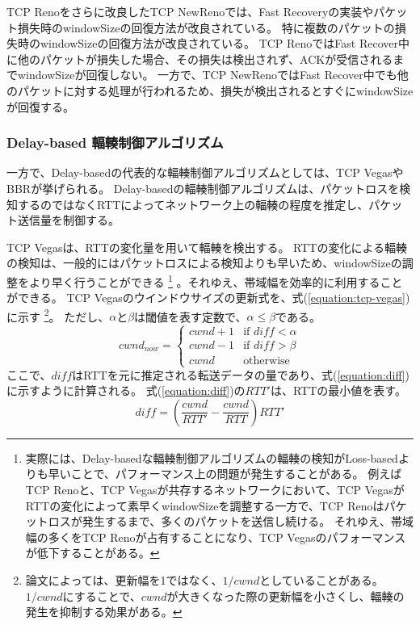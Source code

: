 \documentclass[a4paper,11pt]{jreport}
\newcommand{\equationref}[1]{式(\ref{#1})}
\begin{document}
TCP Renoをさらに改良したTCP NewReno\cite{floyd2004newreno,henderson2012newreno}では、Fast Recoveryの実装やパケット損失時のwindowSizeの回復方法が改良されている。
特に複数のパケットの損失時のwindowSizeの回復方法が改良されている。
TCP RenoではFast Recover中に他のパケットが損失した場合、その損失は検出されず、ACKが受信されるまでwindowSizeが回復しない。
一方で、TCP NewRenoではFast Recover中でも他のパケットに対する処理が行われるため、損失が検出されるとすぐにwindowSizeが回復する。

\cite{cubic}

\subsubsection*{Delay-based 輻輳制御アルゴリズム}

一方で、Delay-basedの代表的な輻輳制御アルゴリズムとしては、TCP Vegas\cite{tcp-vegas}やBBR\cite{bbr}が挙げられる。
Delay-basedの輻輳制御アルゴリズムは、パケットロスを検知するのではなくRTTによってネットワーク上の輻輳の程度を推定し、パケット送信量を制御する。

TCP Vegasは、RTTの変化量を用いて輻輳を検出する。
RTTの変化による輻輳の検知は、一般的にはパケットロスによる検知よりも早いため、windowSizeの調整をより早く行うことができる
\footnote{実際には、Delay-basedな輻輳制御アルゴリズムの輻輳の検知がLoss-basedよりも早いことで、パフォーマンス上の問題が発生することがある。
例えばTCP Renoと、TCP Vegasが共存するネットワークにおいて、TCP VegasがRTTの変化によって素早くwindowSizeを調整する一方で、TCP Renoはパケットロスが発生するまで、多くのパケットを送信し続ける。
それゆえ、帯域幅の多くをTCP Renoが占有することになり、TCP Vegasのパフォーマンスが低下することがある。
}
。それゆえ、帯域幅を効率的に利用することができる。
TCP Vegasのウインドウサイズの更新式を、\equationref{equation:tcp-vegas}に示す
\footnote{論文によっては、更新幅を1ではなく、$1/cwnd$としていることがある。
$1/cwnd$にすることで、$cwnd$が大きくなった際の更新幅を小さくし、輻輳の発生を抑制する効果がある。}。
ただし、$\alpha$と$\beta$は閾値を表す定数で、$\alpha \leq \beta$である。
\begin{equation}
  \label{equation:tcp-vegas}
  cwnd_{now} =
  \begin{cases}
    cwnd + 1 & \text{if } diff < \alpha \\
    cwnd - 1 & \text{if } diff > \beta \\
    cwnd & \text{otherwise}
  \end{cases}
\end{equation}
ここで、$diff$はRTTを元に推定される転送データの量であり、\equationref{equation:diff}に示すように計算される。
\equationref{equation:diff}の$RTT'$は、RTTの最小値を表す。
\begin{equation}
  \label{equation:diff}
  diff = \left( \frac{cwnd}{RTT'} - \frac{cwnd}{RTT}\right) RTT'
\end{equation}
\end{document}
